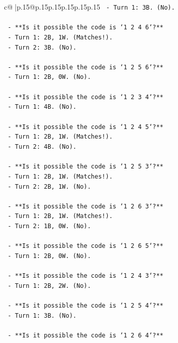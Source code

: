 \documentclass{article}
\begin{document}
{\begin{supertabular}{c@{$\;$}|p{.15\linewidth}@{}p{.15\linewidth}p{.15\linewidth}p{.15\linewidth}p{.15\linewidth}p{.15\linewidth}}
{{{\texttt{        {-} Turn 1: 3B. (No).} \\
\\ 
\texttt{    {-} **Is it possible the code is `1 2 4 6`?**} \\
\texttt{        {-} Turn 1: 2B, 1W. (Matches!).} \\
\texttt{        {-} Turn 2: 3B. (No).} \\
\\ 
\texttt{    {-} **Is it possible the code is `1 2 5 6`?**} \\
\texttt{        {-} Turn 1: 2B, 0W. (No).} \\
\\ 
\texttt{    {-} **Is it possible the code is `1 2 3 4`?**} \\
\texttt{        {-} Turn 1: 4B. (No).} \\
\\ 
\texttt{    {-} **Is it possible the code is `1 2 4 5`?**} \\
\texttt{        {-} Turn 1: 2B, 1W. (Matches!).} \\
\texttt{        {-} Turn 2: 4B. (No).} \\
\\ 
\texttt{    {-} **Is it possible the code is `1 2 5 3`?**} \\
\texttt{        {-} Turn 1: 2B, 1W. (Matches!).} \\
\texttt{        {-} Turn 2: 2B, 1W. (No).} \\
\\ 
\texttt{    {-} **Is it possible the code is `1 2 6 3`?**} \\
\texttt{        {-} Turn 1: 2B, 1W. (Matches!).} \\
\texttt{        {-} Turn 2: 1B, 0W. (No).} \\
\\ 
\texttt{    {-} **Is it possible the code is `1 2 6 5`?**} \\
\texttt{        {-} Turn 1: 2B, 0W. (No).} \\
\\ 
\texttt{    {-} **Is it possible the code is `1 2 4 3`?**} \\
\texttt{        {-} Turn 1: 2B, 2W. (No).} \\
\\ 
\texttt{    {-} **Is it possible the code is `1 2 5 4`?**} \\
\texttt{        {-} Turn 1: 3B. (No).} \\
\\ 
\texttt{    {-} **Is it possible the code is `1 2 6 4`?**} \\
}}}
\end{supertabular}}
\end{document}

